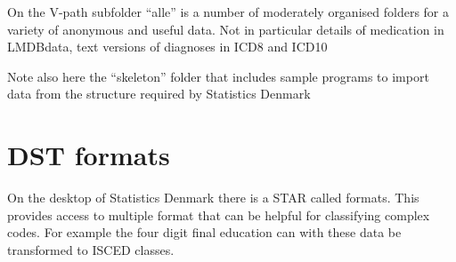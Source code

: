 \documentclass[
]{article}
\begin{document}
On the V-path subfolder ``alle'' is a number of moderately organised
folders for a variety of anonymous and useful data. Not in particular
details of medication in LMDBdata, text versions of diagnoses in ICD8
and ICD10

Note also here the ``skeleton'' folder that includes sample programs to
import data from the structure required by Statistics Denmark

\hypertarget{dst-formats}{%
\section{DST formats}\label{dst-formats}}

On the desktop of Statistics Denmark there is a STAR called formats.
This provides access to multiple format that can be helpful for
classifying complex codes. For example the four digit final education
can with these data be transformed to ISCED classes.
\end{document}
